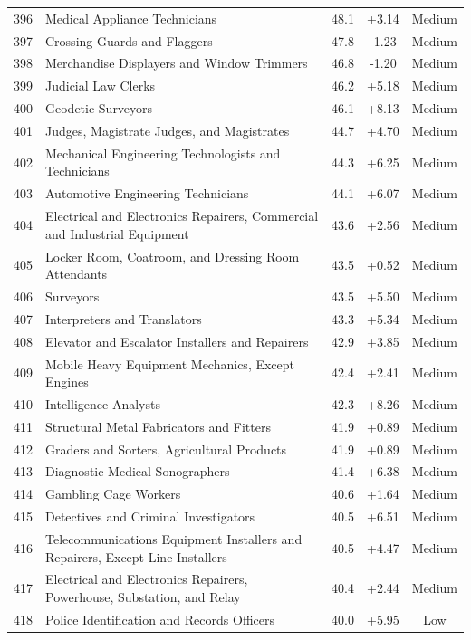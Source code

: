 {\begin{longtable}{rp{7cm}ccc}
396 & Medical Appliance Technicians & 48.1 & +3.14 & Medium \\
397 & Crossing Guards and Flaggers & 47.8 & -1.23 & Medium \\
398 & Merchandise Displayers and Window Trimmers & 46.8 & -1.20 & Medium \\
399 & Judicial Law Clerks & 46.2 & +5.18 & Medium \\
400 & Geodetic Surveyors & 46.1 & +8.13 & Medium \\
401 & Judges, Magistrate Judges, and Magistrates & 44.7 & +4.70 & Medium \\
402 & Mechanical Engineering Technologists and Technicians & 44.3 & +6.25 & Medium \\
403 & Automotive Engineering Technicians & 44.1 & +6.07 & Medium \\
404 & Electrical and Electronics Repairers, Commercial and Industrial Equipment & 43.6 & +2.56 & Medium \\
405 & Locker Room, Coatroom, and Dressing Room Attendants & 43.5 & +0.52 & Medium \\
406 & Surveyors & 43.5 & +5.50 & Medium \\
407 & Interpreters and Translators & 43.3 & +5.34 & Medium \\
408 & Elevator and Escalator Installers and Repairers & 42.9 & +3.85 & Medium \\
409 & Mobile Heavy Equipment Mechanics, Except Engines & 42.4 & +2.41 & Medium \\
410 & Intelligence Analysts & 42.3 & +8.26 & Medium \\
411 & Structural Metal Fabricators and Fitters & 41.9 & +0.89 & Medium \\
412 & Graders and Sorters, Agricultural Products & 41.9 & +0.89 & Medium \\
413 & Diagnostic Medical Sonographers & 41.4 & +6.38 & Medium \\
414 & Gambling Cage Workers & 40.6 & +1.64 & Medium \\
415 & Detectives and Criminal Investigators & 40.5 & +6.51 & Medium \\
416 & Telecommunications Equipment Installers and Repairers, Except Line Installers & 40.5 & +4.47 & Medium \\
417 & Electrical and Electronics Repairers, Powerhouse, Substation, and Relay & 40.4 & +2.44 & Medium \\
418 & Police Identification and Records Officers & 40.0 & +5.95 & Low \\

\end{longtable}}
